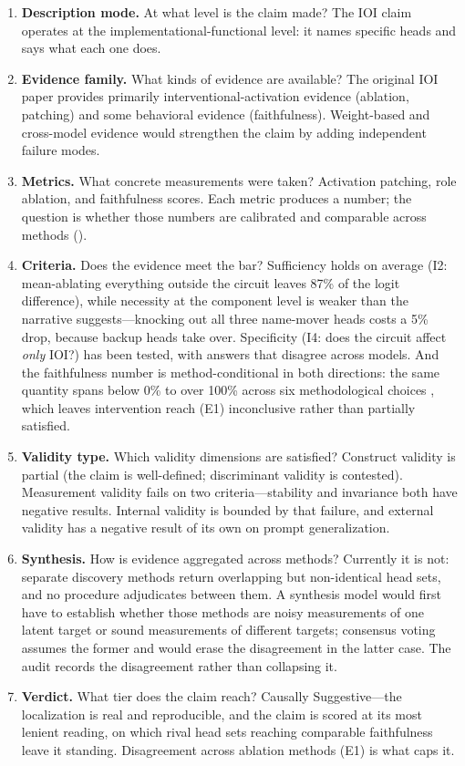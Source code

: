 \documentclass{article}
\begin{document}
\begin{enumerate}[nosep]
\item \textbf{Description mode.} At what level is the claim made? The IOI claim operates at the implementational-functional level: it names specific heads and says what each one does.

\item \textbf{Evidence family.} What kinds of evidence are available? The original IOI paper provides primarily interventional-activation evidence (ablation, patching) and some behavioral evidence (faithfulness). Weight-based and cross-model evidence would strengthen the claim by adding independent failure modes.

\item \textbf{Metrics.} What concrete measurements were taken? Activation patching, role ablation, and faithfulness scores. Each metric produces a number; the question is whether those numbers are calibrated and comparable across methods ().

\item \textbf{Criteria.} Does the evidence meet the bar? Sufficiency holds on average (I2: mean-ablating everything outside the circuit leaves 87\% of the logit difference), while necessity at the component level is weaker than the narrative suggests---knocking out all three name-mover heads costs a 5\% drop, because backup heads take over. Specificity (I4: does the circuit affect \emph{only} IOI?) has been tested, with answers that disagree across models. And the faithfulness number is method-conditional in both directions: the same quantity spans below 0\% to over 100\% across six methodological choices \citep{miller2024transformer}, which leaves intervention reach (E1) inconclusive rather than partially satisfied.

\item \textbf{Validity type.} Which validity dimensions are satisfied? Construct validity is partial (the claim is well-defined; discriminant validity is contested). Measurement validity fails on two criteria---stability and invariance both have negative results. Internal validity is bounded by that failure, and external validity has a negative result of its own on prompt generalization.

\item \textbf{Synthesis.} How is evidence aggregated across methods? Currently it is not: separate discovery methods return overlapping but non-identical head sets, and no procedure adjudicates between them. A synthesis model would first have to establish whether those methods are noisy measurements of one latent target or sound measurements of different targets; consensus voting assumes the former and would erase the disagreement in the latter case. The audit records the disagreement rather than collapsing it.

\item \textbf{Verdict.} What tier does the claim reach? Causally Suggestive---the localization is real and reproducible, and the claim is scored at its most lenient reading, on which rival head sets reaching comparable faithfulness leave it standing. Disagreement across ablation methods (E1) is what caps it.
\end{enumerate}
\end{document}

